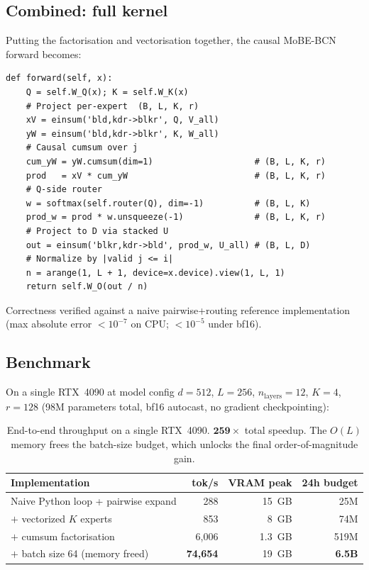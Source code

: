 \documentclass[11pt]{article}
\begin{document}
\subsection{Combined: full kernel}

Putting the factorisation and vectorisation together, the causal
MoBE-BCN forward becomes:

\begin{lstlisting}
def forward(self, x):
    Q = self.W_Q(x); K = self.W_K(x)
    # Project per-expert  (B, L, K, r)
    xV = einsum('bld,kdr->blkr', Q, V_all)
    yW = einsum('bld,kdr->blkr', K, W_all)
    # Causal cumsum over j
    cum_yW = yW.cumsum(dim=1)                    # (B, L, K, r)
    prod   = xV * cum_yW                         # (B, L, K, r)
    # Q-side router
    w = softmax(self.router(Q), dim=-1)          # (B, L, K)
    prod_w = prod * w.unsqueeze(-1)              # (B, L, K, r)
    # Project to D via stacked U
    out = einsum('blkr,kdr->bld', prod_w, U_all) # (B, L, D)
    # Normalize by |valid j <= i|
    n = arange(1, L + 1, device=x.device).view(1, L, 1)
    return self.W_O(out / n)
\end{lstlisting}

Correctness verified against a naive pairwise+routing reference
implementation (max absolute error $< 10^{-7}$ on CPU; $< 10^{-5}$ under
bf16).

\subsection{Benchmark}
\label{sec:benchmark}

On a single RTX~4090 at model config $d = 512$, $L = 256$,
$n_{\mathrm{layers}} = 12$, $K = 4$, $r = 128$ (98M parameters total,
bf16 autocast, no gradient checkpointing):

\begin{table}[h]
\centering
\small
\begin{tabular}{lrrr}
\toprule
\textbf{Implementation} & \textbf{tok/s} & \textbf{VRAM peak} & \textbf{24h budget} \\
\midrule
Naive Python loop + pairwise expand & 288    & 15~GB & 25M \\
$+$ vectorized $K$ experts          & 853    &  8~GB & 74M \\
$+$ cumsum factorisation            & 6{,}006 & 1.3~GB & 519M \\
$+$ batch size 64 (memory freed)    & \textbf{74{,}654} & 19~GB & \textbf{6.5B} \\
\bottomrule
\end{tabular}
\caption{End-to-end throughput on a single RTX~4090. $\mathbf{259\times}$
total speedup. The $O(L)$ memory frees the batch-size budget, which
unlocks the final order-of-magnitude gain.}
\label{tab:benchmark}
\end{table}
\end{document}
